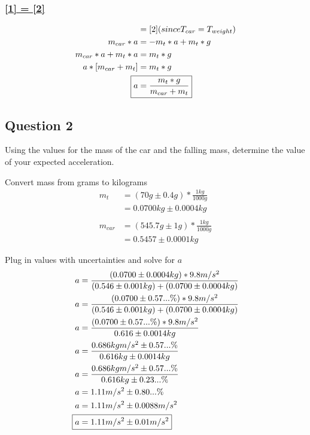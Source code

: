 \documentclass{article}
\begin{document}
\subsubsection{\underline{[1] = [2]}}
\begin{align*}
[1] & = [2] (since T_{car} = T_{weight}) \\
m_{car}*a 		& = -m_{t}*a + m_{t}*g \\
m_{car}*a + m_{t}*a 	& = m_{t}*g \\
a*[m_{car} + m_{t}] 	& = m_{t}*g \\
\Aboxed{a & = \frac{m_{t}*g}{m_{car} + m_{t}}}
\end{align*}

\pagebreak

\subsection{Question 2}
Using the values for the mass of the car and the falling mass, determine the value of your expected acceleration.

Convert mass from grams to kilograms
\begin{align*}
m_{t} 		& = (70g\pm0.4g) * \frac{1kg}{1000g}\\
			& = 0.0700kg\pm0.0004kg\\
\\
m_{car}		& = (545.7g\pm1g) * \frac{1kg}{1000g}\\
			& = 0.5457\pm0.0001kg
\end{align*}

Plug in values with uncertainties and solve for $a$
\begin{align*}
a 			& = \frac{(0.0700\pm0.0004kg) * 9.8m/s^2}{(0.546\pm0.001kg) + (0.0700\pm0.0004kg)}\\
a 			& = \frac{(0.0700\pm0.57...\%) * 9.8m/s^2}{(0.546\pm0.001kg) + (0.0700\pm0.0004kg)}\\
a 			& = \frac{(0.0700\pm0.57...\%) * 9.8m/s^2}{0.616\pm0.0014kg}\\
a 			& = \frac{0.686kgm/s^2\pm0.57...\%}{0.616kg\pm0.0014kg}\\
a 			& = \frac{0.686kgm/s^2\pm0.57...\%}{0.616kg\pm0.23...\%}\\
a 			& = 1.11m/s^2 \pm 0.80...\%\\
a 			& = 1.11m/s^2 \pm 0.0088m/s^2\\
\Aboxed{a 	& = 1.11m/s^2 \pm 0.01m/s^2}
\end{align*}

\pagebreak
\end{document}
